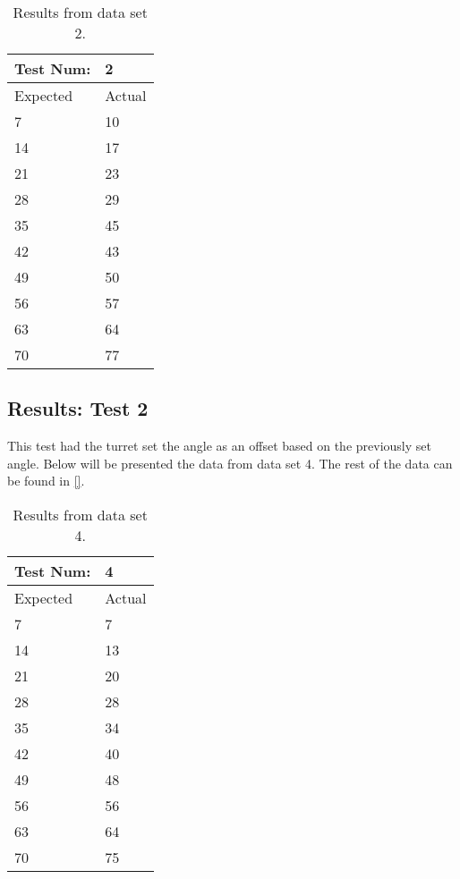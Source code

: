 \begin{table}[H]
\centering
\begin{tabular}{ll}
Test Num:                     & 2      \\ \hline
\multicolumn{1}{l|}{Expected} & Actual \\ \hline
\multicolumn{1}{l|}{7}        & 10     \\
\multicolumn{1}{l|}{14}       & 17     \\
\multicolumn{1}{l|}{21}       & 23     \\
\multicolumn{1}{l|}{28}       & 29     \\
\multicolumn{1}{l|}{35}       & 45     \\
\multicolumn{1}{l|}{42}       & 43     \\
\multicolumn{1}{l|}{49}       & 50     \\
\multicolumn{1}{l|}{56}       & 57     \\
\multicolumn{1}{l|}{63}       & 64     \\
\multicolumn{1}{l|}{70}       & 77
\end{tabular}
\caption{Results from data set 2.}
\label{AngleTest1Result}
\end{table}

\subsection{Results: Test 2}
This test had the turret set the angle as an offset based on the previously set
angle. Below will be presented the data from data set 4.
The rest of the data can be found in \autoref{}.

\begin{table}[H]
\centering
\begin{tabular}{ll}
Test Num:                     & 4      \\ \hline
\multicolumn{1}{l|}{Expected} & Actual \\ \hline
\multicolumn{1}{l|}{7}        & 7     \\
\multicolumn{1}{l|}{14}       & 13     \\
\multicolumn{1}{l|}{21}       & 20     \\
\multicolumn{1}{l|}{28}       & 28     \\
\multicolumn{1}{l|}{35}       & 34     \\
\multicolumn{1}{l|}{42}       & 40     \\
\multicolumn{1}{l|}{49}       & 48     \\
\multicolumn{1}{l|}{56}       & 56     \\
\multicolumn{1}{l|}{63}       & 64     \\
\multicolumn{1}{l|}{70}       & 75
\end{tabular}
\caption{Results from data set 4.}
\label{AngleTest1Result}
\end{table}
